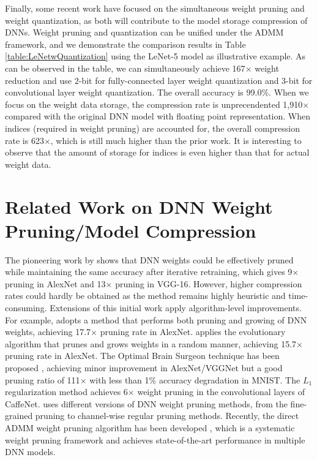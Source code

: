 \documentclass{article} %
\begin{document}
Finally, some recent work have focused on the simultaneous weight pruning and weight quantization, as both will contribute to the model storage compression of DNNs. Weight pruning and quantization can be unified under the ADMM framework, and we demonstrate the comparison results in Table \ref{table:LeNetwQuantization} using the LeNet-5 model as illustrative example. As can be observed in the table, we can simultaneously achieve 167$\times$ weight reduction and use 2-bit for fully-connected layer weight quantization and 3-bit for convolutional layer weight quantization. The overall accuracy is 99.0\%. When we focus on the weight data storage, the compression rate is unprecendented 1,910$\times$ compared with the original DNN model with floating point representation. When indices (required in weight pruning) are accounted for, the overall compression rate is 623$\times$, which is still much higher than the prior work. It is interesting to observe that the amount of storage for indices is even higher than that for actual weight data.















\section{Related Work on DNN Weight Pruning/Model Compression}

The pioneering work by \citet{han2015learning} shows that DNN weights could be effectively pruned while maintaining the same accuracy after iterative retraining, which gives 9$\times$ pruning in AlexNet and 13$\times$ pruning in VGG-16. 
However, higher compression rates could hardly be obtained as the method remains highly heuristic and time-consuming. Extensions of this initial work apply algorithm-level improvements. 
For example, \citet{guo2016dynamic} adopts a method that performs both pruning and growing of DNN weights, achieving 17.7$\times$ pruning rate in AlexNet.
\citet{dai2017nest} applies the evolutionary algorithm that prunes and grows weights in a random manner, achieving 15.7$\times$ pruning rate in AlexNet. The Optimal Brain Surgeon technique has been proposed \citet{dong2017learning}, achieving minor improvement in AlexNet/VGGNet but a good pruning ratio of 111$\times$ with less than 1\% accuracy degradation in MNIST. The $L_1$ regularization method \citep{wen2016learning} achieves 6$\times$ weight pruning in the convolutional layers of CaffeNet. \citet{mao2017exploring} uses different versions of DNN weight pruning methods, from the fine-grained pruning to channel-wise regular pruning methods.
Recently, the direct ADMM weight pruning algorithm has been developed \citep{zhang2018systematic}, which is a systematic weight pruning framework and achieves state-of-the-art performance in multiple DNN models.
\end{document}
